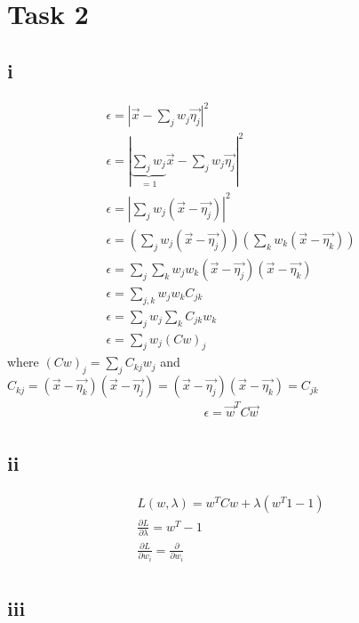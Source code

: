 \section*{Task 2}

\subsection*{i}

\begin{gather*}
\epsilon = |\vec{x}  - \sum_j w_j \vec{\eta_j}|^2 \\
\epsilon = |\underbrace{\sum_j w_j}_{=1} \vec{x} -  \sum_j w_j \vec{\eta_j}|^2 \\
\epsilon = |\sum_j w_j (\vec{x} - \vec{\eta_j})|^2 \\
\epsilon = (\sum_j w_j (\vec{x} - \vec{\eta_j})) (\sum_k w_k (\vec{x} - \vec{\eta_k})) \\
\epsilon = \sum_j \sum_k w_j w_k  (\vec{x} - \vec{\eta_j}) (\vec{x} - \vec{\eta_k}) \\
\epsilon = \sum_{j,k} w_j w_k C_{jk} \\
\epsilon = \sum_j w_j \sum_k C_{jk} w_k \\
\epsilon = \sum_j w_j (C w)_j
\end{gather*}
where $(C w)_j = \sum_j C_{kj} w_j$ and $C_{kj} = (\vec{x} - \vec{\eta_k}) (\vec{x} - \vec{\eta_j}) = (\vec{x} - \vec{\eta_j}) (\vec{x} - \vec{\eta_k}) = C_{jk}$
\begin{gather*}
\epsilon = \vec{w}^TC\vec{w} \\
\end{gather*}

\subsection*{ii}

\begin{gather*}
L(w,\lambda) = w^T Cw + \lambda(w^T 1 - 1) \\
\frac{\partial L}{\partial \lambda} = w^T  -1 \\
\frac{\partial L}{\partial w_i} = \frac{\partial}{\partial w_i} \\
\end{gather*}
\subsection*{iii}


\clearpage
